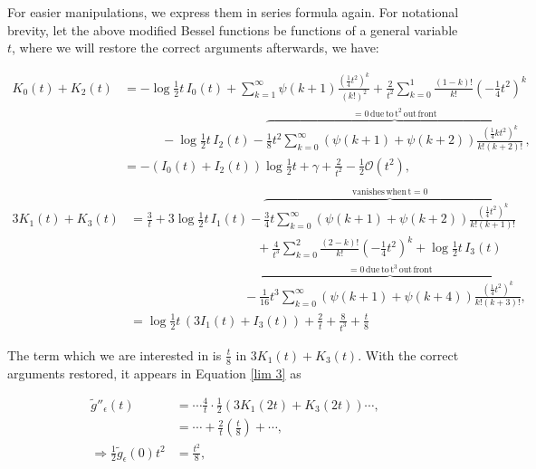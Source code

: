 \documentclass{article}
\numberwithin{equation}{section} %
\begin{document}
\noindent For easier manipulations, we express them in series formula again. For notational brevity, let the above modified Bessel functions be functions of a general variable $t$, where we will restore the correct arguments afterwards, we have:

\begin{equation*}
\begin{split}
K_0(t) + K_2(t) &= -\log \frac{1}{2}t \, I_0(t) + \sum_{k=1}^\infty \psi(k+1) \frac{(\frac{1}{4}t^2)^k}{(k!)^2} + \frac{2}{t^2}\sum_{k=0}^1 \frac{(1-k)!}{k!}(-\frac{1}{4}t^2)^k\\
&\quad\quad\quad -\log\frac{1}{2}t \, I_2(t) - \overbrace{\frac{1}{8}t^2\sum_{k=0}^\infty (\psi(k+1) + \psi(k+2))\frac{(\frac{1}{4}kt^2)^k}{k!(k+2)!}}^{\mathrm{=0 \, due \, to \, t^2 \,out \, front}}\, ,\\
&= -(I_0(t) + I_2(t)) \log \frac{1}{2}t + \gamma + \frac{2}{t^2} - \frac{1}{2}  \mathcal{O}(t^2) ,\\
\end{split}
\end{equation*}
\begin{equation}
\begin{split}
3K_1(t) + K_3(t) &= \frac{3}{t} + 3\log \frac{1}{2}t \, I_1(t) - \overbrace{\frac{3}{4}t \sum_{k=0}^\infty(\psi(k+1) + \psi(k+2)) \frac{(\frac{1}{4}t^2)^k}{k!(k+1)!}}^{\mathrm{vanishes \, when \, t=0}}\\
& \quad\quad\quad\quad\quad\quad\quad\quad\quad\quad + \frac{4}{t^3}\sum_{k=0}^2 \frac{(2-k)!}{k!}(-\frac{1}{4}t^2)^k + \log \frac{1}{2}t \, I_3(t) \\
& \quad\quad\quad\quad\quad\quad\quad\quad\quad-  \overbrace{\frac{1}{16}t^3 \sum_{k=0}^\infty (\psi(k+1) + \psi(k+4)) \frac{(\frac{1}{4}t^2)^k}{k!(k+3)!}}^{\mathrm{=0 \, due \, to \, t^3 \,out \, front}},\\
&=\log\frac{1}{2}t \, (3I_1(t) + I_3(t)) + \frac{2}{t} + \frac{8}{t^3} + \frac{t}{8}
\end{split}
\label{lim 31}
\end{equation}

\noindent The term which we are interested in is $\frac{t}{8}$ in $3K_1(t) + K_3(t)$. With the correct arguments restored, it appears in Equation \ref{lim 3} as 

\begin{equation}
\begin{split}
\tilde{g}''_\epsilon(t) &= \cdots \frac{4}{t}\cdot \frac{1}{2}(3K_1(2t) + K_3(2t)) \cdots ,\\
&= \cdots + \frac{2}{t} (\frac{t}{8}) + \cdots,\\
\Rightarrow \frac{1}{2}\tilde{g}_\epsilon(0)t^2 &= \frac{t^2}{8},
\end{split}
\label{lim 32}
\end{equation}
\end{document}
